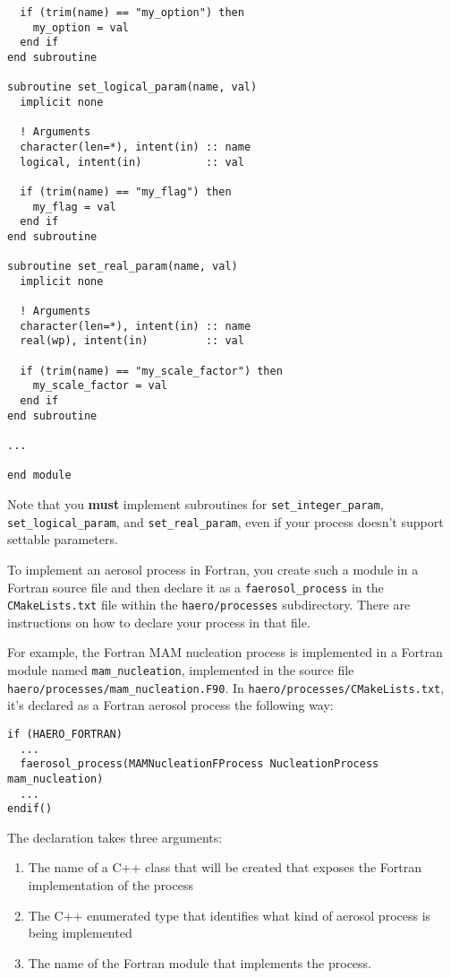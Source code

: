\begin{lstlisting}
  if (trim(name) == "my_option") then
    my_option = val
  end if
end subroutine

subroutine set_logical_param(name, val)
  implicit none

  ! Arguments
  character(len=*), intent(in) :: name
  logical, intent(in)          :: val

  if (trim(name) == "my_flag") then
    my_flag = val
  end if
end subroutine

subroutine set_real_param(name, val)
  implicit none

  ! Arguments
  character(len=*), intent(in) :: name
  real(wp), intent(in)         :: val

  if (trim(name) == "my_scale_factor") then
    my_scale_factor = val
  end if
end subroutine

...

end module
\end{lstlisting}

Note that you {\bf must} implement subroutines for \texttt{set\_integer\_param},
\texttt{set\_logical\_param}, and \texttt{set\_real\_param}, even if your process
doesn't support settable parameters.

To implement an aerosol process in Fortran, you create such a module in a
Fortran source file and then declare it as a \texttt{faerosol\_process} in the
\texttt{CMakeLists.txt} file within the \texttt{haero/processes} subdirectory.
There are instructions on how to declare your process in that file.

For example, the Fortran MAM nucleation process is implemented in a Fortran
module named \texttt{mam\_nucleation}, implemented in the source file
\texttt{haero/processes/mam\_nucleation.F90}. In
\texttt{haero/processes/CMakeLists.txt}, it's declared as a Fortran aerosol
process the following way:

\begin{lstlisting}
if (HAERO_FORTRAN)
  ...
  faerosol_process(MAMNucleationFProcess NucleationProcess mam_nucleation)
  ...
endif()
\end{lstlisting}

The declaration takes three arguments:

\begin{enumerate}
  \item The name of a C++ class that will be created that exposes the Fortran
        implementation of the process
  \item The C++ enumerated type that identifies what kind of aerosol process
        is being implemented
  \item The name of the Fortran module that implements the process.
\end{enumerate}

